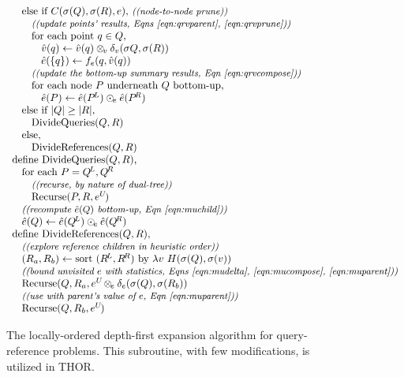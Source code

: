 \documentclass[twoside,leqno,twocolumn]{article}
\newcommand{\com}[1]{{\small \textit{((#1))}}}
\newcommand{\summary}{\delta}
\newcommand{\psty}{}
\newcommand{\X}{\\ \psty}
\newcommand{\x}{\X \hspace{0.13in}}
\newcommand{\xx}{\X \hspace{0.26in}}
\newcommand{\xxx}{\X \hspace{0.39in}}
\newcommand{\kdroot}[1]{#1^{\text{root}}}
\newcommand{\kdleft}[1]{#1^{\!L}}
\newcommand{\kdright}[1]{#1^{\!R}}
\newcommand{\nameop}[2]{#1_{\!#2}}
\newcommand{\myop}[1]{\nameop{\otimes}{#1}}
\newcommand{\letterqr}{v}
\newcommand{\outqr}{V}
\newcommand{\opqr}{\myop{\letterqr}}
\newcommand{\gqr}{g_{\letterqr}}
\newcommand{\letterqrv}{v}
\newcommand{\deltaqrv}{\summary_{\letterqrv}}
\newcommand{\varqr}{\hat{\letterqr}}
\newcommand{\varqrvparent}{\letterqrv^{P}}
\newcommand{\lettermu}{e}
\newcommand{\outopmu}{\nameop{\odot}{\lettermu}}
\newcommand{\opmu}{\myop{\lettermu}}
\newcommand{\fmu}{f_{\lettermu}}
\newcommand{\fmuv}{f_{\lettermu}}
\newcommand{\deltamu}{\summary_{\lettermu}}
\newcommand{\canprunemu}{C}
\newcommand{\heurqr}{H}
\newcommand{\varmuchild}{\hat{\lettermu}}
\newcommand{\varmuparent}{\lettermu^{U\!}}
\newcommand{\outstat}{\sigma}
\begin{document}
\begin{figure}
{$$\begin{array}[t]{l}
    \x \text{else if } \canprunemu(\outstat(Q), \outstat(R), \lettermu)\text{, \com{node-to-node prune}}
    \xx \text{\com{update points' results, Eqns \ref{eqn:qrvparent}, \ref{eqn:qrvprune}}}
    \xx \text{for each point }q \in Q\text{,}
    \xxx \varqr(q) \gets \varqr(q) \opqr \deltaqrv(\outstat{Q}, \outstat(R))
    \xxx \varmuchild(\{q\}) \gets \fmu(q, \varqr(q))
    \xx \text{\com{update the bottom-up summary results, Eqn \ref{eqn:qrvcompose}}}
    \xx \text{for each node }P\text{ underneath }Q\text{ bottom-up,}
    \xxx \varmuchild(P) \gets \varmuchild(\kdleft{P}) \outopmu \varmuchild(\kdright{P})
    \x \text{else if } |Q| \geq |R|\text{,}
    \xx \text{DivideQueries}(Q, R)
    \x \text{else,}
    \xx \text{DivideReferences}(Q, R)
    
    \X \text{define DivideQueries}(Q, R)\text{,}
    \x \text{for each } P = \kdleft{Q}, \kdright{Q}
    \xx \text{\com{recurse, by nature of dual-tree}}
    \xx \text{Recurse}(P, R, \varmuparent)
    \x \text{\com{recompute $\varmuchild(Q)$ bottom-up, Eqn~\ref{eqn:muchild}}}
    \x \varmuchild(Q) \gets \varmuchild(\kdleft{Q}) \outopmu \varmuchild(\kdright{Q})

    \X \text{define DivideReferences}(Q, R)\text{,}
    \x \text{\com{explore reference children in heuristic order}}
    \x (R_a, R_b) \gets \text{sort }(\kdleft{R}, \kdright{R})\text{ by }\lambda v ~ \heurqr(\outstat(Q), \outstat(v))
    \x \text{\com{bound unvisited $\lettermu$ with statistics, Eqns \ref{eqn:mudelta}, \ref{eqn:mucompose}, \ref{eqn:muparent}}}
    \x \text{Recurse}(Q, R_a, \varmuparent \opmu \deltamu(\outstat(Q), \outstat(R_b))
    \x \text{\com{use with parent's value of $\lettermu$, Eqn \ref{eqn:muparent}}}
    \x \text{Recurse}(Q, R_b, \varmuparent)
  \end{array}$$}
\caption{\label{fig:DepthFirst} The locally-ordered depth-first expansion algorithm for query-reference problems.
This subroutine, with few modifications, is utilized in THOR.
}
\end{figure}
\end{document}
